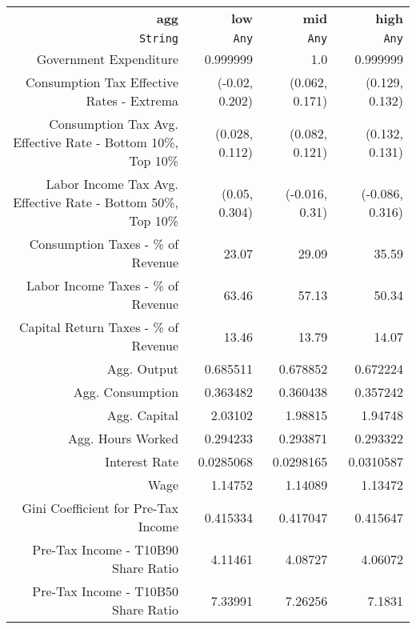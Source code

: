 \begin{tabular}{rrrr}
  \hline
  \textbf{agg} & \textbf{low} & \textbf{mid} & \textbf{high} \\
  \texttt{String} & \texttt{Any} & \texttt{Any} & \texttt{Any} \\\hline
  Government Expenditure & 0.999999 & 1.0 & 0.999999 \\
  Consumption Tax Effective Rates - Extrema & (-0.02, 0.202) & (0.062, 0.171) & (0.129, 0.132) \\
  Consumption Tax Avg. Effective Rate - Bottom 10\%, Top 10\% & (0.028, 0.112) & (0.082, 0.121) & (0.132, 0.131) \\
  Labor Income Tax Avg. Effective Rate - Bottom 50\%, Top 10\% & (0.05, 0.304) & (-0.016, 0.31) & (-0.086, 0.316) \\
  Consumption Taxes - \% of Revenue & 23.07 & 29.09 & 35.59 \\
  Labor Income Taxes - \% of Revenue & 63.46 & 57.13 & 50.34 \\
  Capital Return Taxes - \% of Revenue & 13.46 & 13.79 & 14.07 \\
  Agg. Output & 0.685511 & 0.678852 & 0.672224 \\
  Agg. Consumption & 0.363482 & 0.360438 & 0.357242 \\
  Agg. Capital & 2.03102 & 1.98815 & 1.94748 \\
  Agg. Hours Worked & 0.294233 & 0.293871 & 0.293322 \\
  Interest Rate & 0.0285068 & 0.0298165 & 0.0310587 \\
  Wage & 1.14752 & 1.14089 & 1.13472 \\
  Gini Coefficient for Pre-Tax Income & 0.415334 & 0.417047 & 0.415647 \\
  Pre-Tax Income - T10B90 Share Ratio & 4.11461 & 4.08727 & 4.06072 \\
  Pre-Tax Income - T10B50 Share Ratio & 7.33991 & 7.26256 & 7.1831 \\\hline
\end{tabular}
